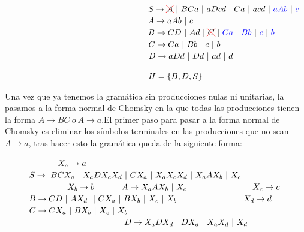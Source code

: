 $ \hspace*{6cm}S\rightarrow \Rcancel{A}\  |\  BCa\  |\ aDcd \  |\ Ca\  |\ acd\  |\ \Blue{aAb}\  |\ \Blue{c} $\newline
$ \hspace*{6cm}A\rightarrow aAb\ |\ c $\newline
$ \hspace*{6cm}B\rightarrow CD\  |\  Ad  \ |\ \Rcancel{C} \  |\ \Blue{Ca}\  |\ \Blue{Bb}\  |\ \Blue{c}\  |\ \Blue{b} $\newline
$ \hspace*{6cm}C\rightarrow Ca\  |\  Bb \ |\ c \  |\ b $\newline
$ \hspace*{6cm}D\rightarrow aDd\ |\ Dd\ |\ ad\  |\ d $\newline

$\hspace*{6cm}H = \{B,D,S\}$\vspace{0.5em} 

Una vez que ya tenemos la gramática sin producciones nulas ni unitarias, la pasamos a la forma normal de Chomsky en la que todas las producciones tienen la forma $A\rightarrow BC \ o\ A\rightarrow a$.El primer paso para pasar a la forma normal de Chomsky es eliminar los símbolos terminales en las producciones que no sean $ A\rightarrow a$, tras hacer esto la gramática queda de la siguiente forma:\vspace{0.5em} \newline

$ \hspace*{2.2cm}X_a\rightarrow a $        $ \hspace*{1cm}S\rightarrow \  BCX_a\  |\ X_aDX_cX_d \  |\ CX_a\  |\ X_aX_cX_d\  |\ X_aAX_b\  |\ X_c $\newline
$ \hspace*{2.6cm}X_b\rightarrow b $        $ \hspace*{1cm}A\rightarrow X_aAX_b\ |\ X_c $\newline
$ \hspace*{2.6cm}X_c\rightarrow c  $        $ \hspace*{1cm}B\rightarrow CD\  |\  AX_d  \ \  |\ CX_a\  |\ BX_b\  |\ X_c\  |\ X_b $\newline
$ \hspace*{2.6cm}X_d\rightarrow d $        $ \hspace*{1cm}C\rightarrow CX_a\  |\  BX_b \ |\ X_c \  |\ X_b $\newline
                                                                              $ \hspace*{5cm}D\rightarrow X_aDX_d\ |\ DX_d\ |\ X_aX_d\  |\ X_d $\newline
\vspace{0.5em} 

